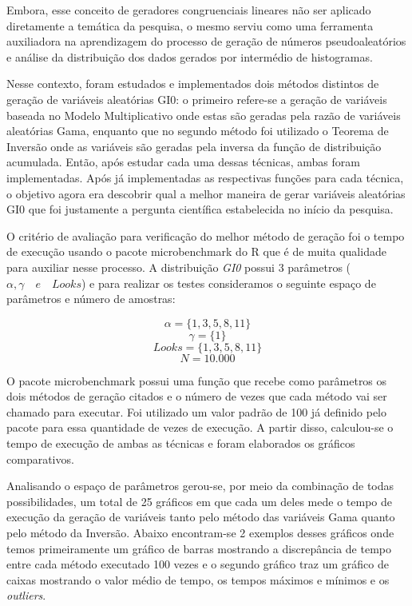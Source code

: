 \documentclass[12pt,letterpaper]{article}
\begin{document}
Embora, esse conceito de geradores congruenciais lineares não ser aplicado diretamente a temática da pesquisa, o mesmo serviu como uma ferramenta auxiliadora na aprendizagem do processo de geração de números pseudoaleatórios e análise da distribuição dos dados gerados por intermédio de histogramas.

Nesse contexto, foram estudados e implementados dois métodos distintos de geração de variáveis aleatórias GI0: o primeiro refere-se a geração de variáveis baseada no Modelo Multiplicativo onde estas são geradas pela razão de variáveis aleatórias Gama, enquanto que no segundo método foi utilizado o Teorema de Inversão onde as variáveis são geradas pela inversa da função de distribuição acumulada. Então, após estudar cada uma dessas técnicas, ambas foram implementadas. Após já implementadas as respectivas funções para cada técnica, o objetivo agora era descobrir qual a melhor maneira de gerar variáveis aleatórias GI0 que foi justamente a pergunta científica estabelecida no início da pesquisa.

O critério de avaliação para verificação do melhor método de geração foi o tempo de execução usando o  pacote microbenchmark do R que é de muita qualidade para auxiliar nesse processo. A distribuição \emph{GI0} possui 3 parâmetros (\begin{math}
\alpha, \gamma \quad e \quad \textit{Looks}
\end{math}) e para realizar os testes consideramos o seguinte espaço de parâmetros e número de amostras:

\begin{equation}
\alpha = \{1, 3, 5, 8, 11\} 
\end{equation}
\begin{equation}
\gamma = \{1\}
\end{equation}
\begin{equation}
Looks = \{1,3,5,8, 11\}
\end{equation}
\begin{equation}
N = 10.000
\end{equation}


O pacote microbenchmark possui uma função que recebe como parâmetros os dois métodos de geração citados e o número de vezes que cada método vai ser chamado para executar. Foi utilizado um valor padrão de 100 já definido pelo pacote para essa quantidade de vezes de execução. A partir disso, calculou-se o tempo de execução de ambas as técnicas e foram elaborados os gráficos comparativos.

Analisando o espaço de parâmetros gerou-se, por meio da combinação de todas possibilidades, um total de 25 gráficos em que cada um deles mede o tempo de execução da geração de variáveis tanto pelo método das variáveis Gama quanto pelo método da Inversão. Abaixo encontram-se 2 exemplos desses gráficos onde temos primeiramente um gráfico de barras mostrando a discrepância de tempo entre cada método executado 100 vezes e o segundo gráfico traz um gráfico de caixas mostrando o valor médio de tempo, os tempos máximos e mínimos e os \textit{outliers}.
\end{document}
